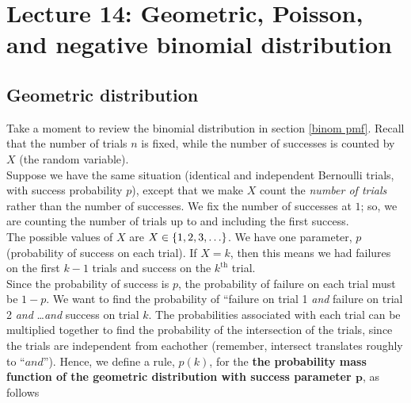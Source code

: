 \chapter{Lecture 14: Geometric, Poisson, and negative binomial distribution}
\section{Geometric distribution} \label{Geometric distribution}
Take a moment to review the binomial distribution in section \ref{binom pmf}. Recall that the number of trials $n$ is fixed, while the number of successes is counted by $X$ (the random variable). \\

\noindent Suppose we have the same situation (identical and independent Bernoulli trials, with success probability $p$), except that we make $X$ count the \textit{number of trials} rather than the number of successes. We fix the number of successes at $1$; so, we are counting the number of trials up to and including the first success. \\

\noindent The possible values of $X$ are $X \in \left\{1,2,3,\ldots\right\}$. We have one parameter, $p$ (probability of success on each trial). If $X = k$, then this means we had failures on the first $k - 1$ trials and success on the $k^{\text{th}}$ trial. \\

\noindent Since the probability of success is $p$, the probability of failure on each trial must be $1-p$. We want to find the probability of ``failure on trial 1 \textit{and} failure on trial 2 \textit{and} \ldots \textit{and} success on trial $k$. The probabilities associated with each trial can be multiplied together to find the probability of the intersection of the trials, since the trials are independent from eachother (remember, intersect translates roughly to ``$\textit{and}$''). Hence, we define a rule, $p(k)$, for the \textbf{the probability mass function of the geometric distribution with success parameter $\boldsymbol{p}$}, as follows

  	\bigskip
	
	\hfil{}
	\bigskip
	\bigskip

